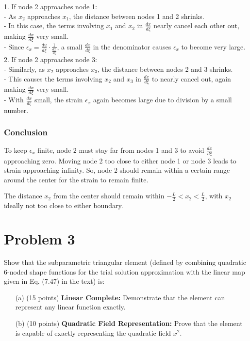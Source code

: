 \documentclass{article}
\begin{document}
1. If node 2 approaches node 1:\\
   - As \( x_2 \) approaches \( x_1 \), the distance between nodes 1 and 2 shrinks.\\
   - In this case, the terms involving \( x_1 \) and \( x_2 \) in \( \frac{dx}{d\xi} \) nearly cancel each other out, making \( \frac{dx}{d\xi} \) very small.\\
   - Since \( \epsilon_x = \frac{du}{d\xi} \cdot \frac{1}{\frac{dx}{d\xi}} \), a small \( \frac{dx}{d\xi} \) in the denominator causes \( \epsilon_x \) to become very large.\\

2. If node 2 approaches node 3:\\
   - Similarly, as \( x_2 \) approaches \( x_3 \), the distance between nodes 2 and 3 shrinks.\\
   - This causes the terms involving \( x_2 \) and \( x_3 \) in \( \frac{dx}{d\xi} \) to nearly cancel out, again making \( \frac{dx}{d\xi} \) very small.\\
   - With \( \frac{dx}{d\xi} \) small, the strain \( \epsilon_x \) again becomes large due to division by a small number.\\

\subsubsection*{Conclusion}

To keep \( \epsilon_x \) finite, node 2 must stay far from nodes 1 and 3 to avoid \( \frac{dx}{d\xi} \) approaching zero. Moving node 2 too close to either node 1 or node 3 leads to strain approaching infinity. 
So, node 2 should remain within a certain range around the center for the strain to remain finite.

The distance \( x_2 \) from the center should remain within \( -\frac{L}{2} < x_2 < \frac{L}{2} \), with \( x_2 \) ideally not too close to either boundary.



\newpage
\section*{Problem 3}

Show that the subparametric triangular element (defined by combining quadratic 6-noded shape functions for the trial solution approximation with the linear map given in Eq. (7.47) in the text) is:
\begin{enumerate}
    \item[(a)] (15 points) \textbf{Linear Complete:} Demonstrate that the element can represent any linear function exactly.
    \item[(b)] (10 points) \textbf{Quadratic Field Representation:} Prove that the element is capable of exactly representing the quadratic field \( x^2 \).
\end{enumerate}
\end{document}
